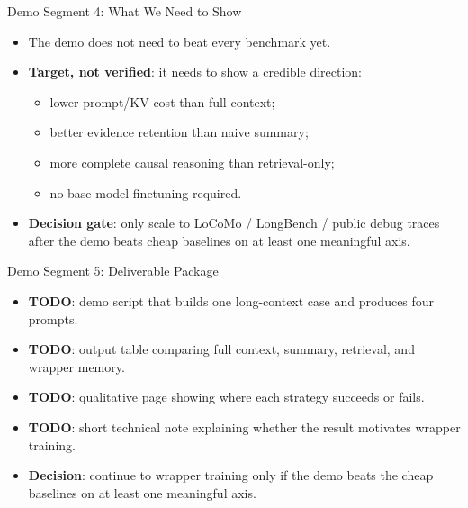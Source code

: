 \begin{frame}{Demo Segment 4: What We Need to Show}
  \begin{itemize}
    \item The demo does not need to beat every benchmark yet.
    \item \textbf{Target, not verified}: it needs to show a credible direction:
      \begin{itemize}
        \item lower prompt/KV cost than full context;
        \item better evidence retention than naive summary;
        \item more complete causal reasoning than retrieval-only;
        \item no base-model finetuning required.
      \end{itemize}
    \item \textbf{Decision gate}: only scale to LoCoMo / LongBench / public debug traces after the demo beats cheap baselines on at least one meaningful axis.
  \end{itemize}
\end{frame}

\begin{frame}{Demo Segment 5: Deliverable Package}
  \begin{itemize}
    \item \textbf{TODO}: demo script that builds one long-context case and produces four prompts.
    \item \textbf{TODO}: output table comparing full context, summary, retrieval, and wrapper memory.
    \item \textbf{TODO}: qualitative page showing where each strategy succeeds or fails.
    \item \textbf{TODO}: short technical note explaining whether the result motivates wrapper training.
    \item \textbf{Decision}: continue to wrapper training only if the demo beats the cheap baselines on at least one meaningful axis.
  \end{itemize}
\end{frame}

